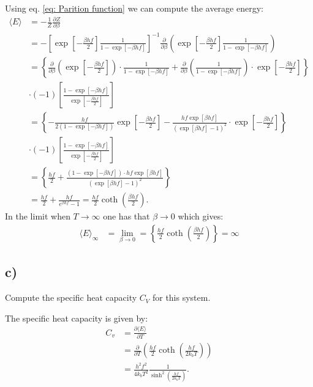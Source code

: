 \documentclass[a4paper]{article}
\newcommand{\average}[1]{\langle #1 \rangle}
\newcommand{\newparagraph}{\vspace{.5cm}\noindent}
\begin{document}
\vspace*{0.5cm}\noindent
Using eq. \eqref{eq: Parition function} we can compute the average energy:
\begin{align*}
    \average{E} &= -\frac{1}{Z}\frac{\partial Z}{\partial \beta}\\
    &= -\left[\exp\left[-\frac{\beta hf}{2}\right]\frac{1}{1-\exp\left[-\beta hf\right]}\right]^{-1}\frac{\partial}{\partial \beta}\left(\exp\left[-\frac{\beta hf}{2}\right]\frac{1}{1-\exp\left[-\beta hf\right]}\right)\\
    &= \left\{\frac{\partial}{\partial \beta}\left(\exp\left[-\frac{\beta hf}{2}\right]\right)\cdot \frac{1}{1-\exp\left[-\beta hf\right]}+\frac{\partial}{\partial \beta}\left(\frac{1}{1-\exp\left[-\beta hf\right]}\right)\cdot \exp\left[-\frac{\beta hf}{2}\right]\right\}\\
    &\cdot(-1)\left[\frac{1-\exp\left[-\beta hf\right]}{\exp\left[-\frac{\beta hf}{2}\right]}\right]\\
    &= \left\{-\frac{hf}{2\left(1-\exp\left[-\beta hf\right]\right)}\exp\left[-\frac{\beta hf}{2}\right] - \frac{hf\exp\left[\beta hf\right]}{\left(\exp\left[\beta hf\right] - 1\right)^2}\cdot\exp\left[-\frac{\beta hf}{2}\right]\right\}\\
    &\cdot(-1)\left[\frac{1-\exp\left[-\beta hf\right]}{\exp\left[-\frac{\beta hf}{2}\right]}\right]\\
    &= \left\{\frac{hf}{2} + \frac{\left(1-\exp\left[-\beta hf\right]\right)\cdot hf \exp\left[\beta hf\right]}{\left(\exp\left[\beta hf\right] - 1\right)^2}\right\}\\
    &= \frac{hf}{2} + \frac{hf}{e^{\beta hf} - 1}= \frac{hf}{2}\coth\left(\frac{\beta hf}{2}\right).
\end{align*}In the limit when $T\to\infty$ one has that $\beta\to0$ which gives:
\begin{align*}
    \average{E}_\infty &= \lim_{\beta\to0} = \left\{\frac{hf}{2}\coth\left(\frac{\beta hf}{2}\right)\right\} = \infty
\end{align*}


\subsection*{c)}
Compute the specific heat capacity $C_V$ for this system.

\newparagraph
The specific heat capacity is given by:
\begin{align*}
    C_v &= \frac{\partial \average{E}}{\partial T}\\
    &= \frac{\partial}{\partial T}\left(\frac{h f}{2}\coth\left(\frac{hf}{2k_bT}\right)\right)\\
    &= \frac{h^2f^2}{4k_bT^2}\frac{1}{\sinh^2\left(\frac{hf}{2k_bT}\right)}.
\end{align*}
\end{document}
